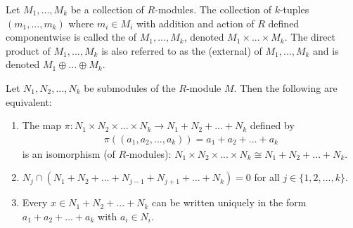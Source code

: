     \begin{definition}\label{def:external-direct-sum}
        Let $M_1,...,M_k$ be a collection of $R$-modules. The collection of $k$-tuples $(m_1,...,m_k)$ where $m_i \in M_i$ with addition and action of $R$ defined componentwise is called the  of $M_1,...,M_k$, denoted $M_1 \times ... \times M_k$. The direct product of $M_1,...,M_k$ is also referred to as the (external)  of $M_1,...,M_k$ and is denoted $M_1 \oplus ... \oplus M_k$.
    \end{definition}

    \begin{proposition}\label{prop:properties-of-direct-prods}
        Let $N_1,N_2,...,N_k$ be submodules of the $R$-module $M$. Then the following are equivalent:
        \begin{enumerate}[label = (\arabic*)]
            \item The map $\pi:N_1 \times N_2 \times ... \times N_k \rightarrow N_1 + N_2 + ... + N_k$ defined by 
                \begin{equation*}
                \begin{split}
                    \pi((a_1,a_2,...,a_k)) = a_1 + a_2 + ... +a_k
                \end{split}
                \end{equation*}
            is an isomorphism (of $R$-modules): $N_1 \times N_2 \times ... \times N_k \cong N_1 + N_2 + ... + N_k$.
            \item $N_j \cap (N_1 + N_2 + ... + N_{j-1} + N_{j+1} + ... + N_k) = 0$ for all $j \in \{1,2,...,k\}$.
            \item Every $x \in N_1 + N_2 + ... + N_k$ can be written uniquely in the form $a_1 + a_2 + ... + a_k$ with $a_i \in N_i$.
        \end{enumerate}
    \end{proposition}
